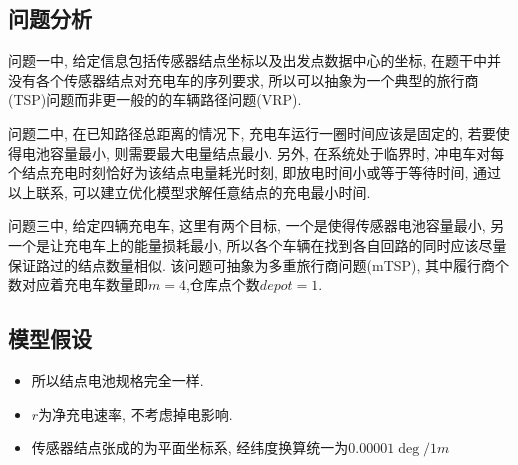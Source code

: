 	
	







	\subsection{问题分析}
		
		问题一中, 给定信息包括传感器结点坐标以及出发点数据中心的坐标, 在题干中并没有各个传感器结点对充电车的序列要求, 所以可以抽象为一个典型的旅行商(TSP)问题而非更一般的的车辆路径问题(VRP).

		问题二中, 在已知路径总距离的情况下, 充电车运行一圈时间应该是固定的, 若要使得电池容量最小, 则需要最大电量结点最小. 另外, 在系统处于临界时, 冲电车对每个结点充电时刻恰好为该结点电量耗光时刻, 即放电时间小或等于等待时间, 通过以上联系, 可以建立优化模型求解任意结点的充电最小时间.

		问题三中, 给定四辆充电车, 这里有两个目标, 一个是使得传感器电池容量最小, 另一个是让充电车上的能量损耗最小, 所以各个车辆在找到各自回路的同时应该尽量保证路过的结点数量相似. 该问题可抽象为多重旅行商问题(mTSP), 其中履行商个数对应着充电车数量即$m=4$,仓库点个数$depot= 1$.
		






		\subsection{模型假设}
		\begin{itemize}
			\item 所以结点电池规格完全一样.
			\item $r$为净充电速率, 不考虑掉电影响.
			\item 传感器结点张成的为平面坐标系, 经纬度换算统一为$0.00001\deg/1m$
		\end{itemize}